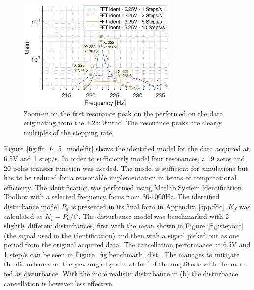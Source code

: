 \begin{figure}[h!]
  \centering
  \includegraphics[width=0.7\textwidth]{fig/matlab/fft_mean_in_out_3V_zoomin.eps}
  \caption{\label{fig:3vzoomin} Zoom-in on the first resonance peak on the \abbrFFT performed on the data originating from the 3.25: 0mrad. The resonance peaks are clearly multiples of the stepping rate.}
\end{figure}
\FloatBarrier
Figure~\ref{fig:fft_6_5_modelfit} shows the identified model for the data acquired at 6.5V and 1 step/s. In order to sufficiently model four resonances, a 19 zeros and 20 poles transfer function was needed. The model is sufficient for simulations but has to be reduced for a reasonable implementation in terms of computational efficiency. The identification was performed using Matlab System Identification Toolbox with a selected frequency focus from 30-1000Hz. The identified disturbance model $P_d$ is presented in its final form in Appendix~\ref{app:fdc}. $K_f$ was calculated as $K_f=P_d/G$.
The disturbance model was benchmarked with 2 slightly different disturbances, first with the mean shown in Figure~\ref{fig:stepout} (the signal used in the identification) and then with a signal picked out as one period from the original acquired data. The cancellation performance  at 6.5V and 1 step/s can be seen in Figure~\ref{fig:benchmark_dist}. The \abbrFDC manages to mitigate the disturbance on the yaw angle by almost half of the amplitude with the mean fed as disturbance. With the more realistic disturbance in (b) the disturbance cancellation is however less effective.


